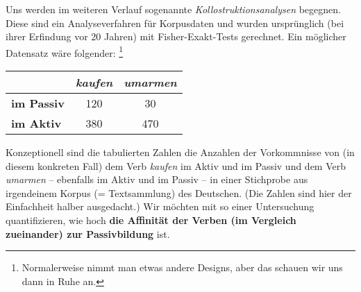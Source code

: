 Uns werden im weiteren Verlauf sogenannte \textit{Kollostruktionsanalysen} begegnen.
Diese sind ein Analyseverfahren für Korpusdaten und wurden ursprünglich (bei ihrer Erfindung vor 20 Jahren) mit Fisher-Exakt-Tests gerechnet.
Ein möglicher Datensatz wäre folgender:%
\footnote{Normalerweise nimmt man etwas andere Designs, aber das schauen wir uns dann in Ruhe an.}

\begin{center}
\begin{tabular}[h]{|l|c|c|}
  \cline{2-3}
  \multicolumn{1}{c|}{} & \textbf{\textit{kaufen}} & \textbf{\textit{umarmen}} \\\hline
  \textbf{im Passiv} & 120 & 30 \\\hline
  \textbf{im Aktiv} & 380 & 470 \\\hline
\end{tabular}
\end{center}

Konzeptionell sind die tabulierten Zahlen die Anzahlen der Vorkommnisse von (in diesem konkreten Fall) dem Verb \textit{kaufen} im Aktiv und im Passiv und dem Verb \textit{umarmen} -- ebenfalls im Aktiv und im Passiv -- in einer Stichprobe aus irgendeinem Korpus (= Textsammlung) des Deutschen.
(Die Zahlen sind hier der Einfachheit halber ausgedacht.)
Wir möchten mit so einer Untersuchung quantifizieren, wie hoch \textbf{die Affinität der Verben (im Vergleich zueinander) zur Passivbildung} ist.

